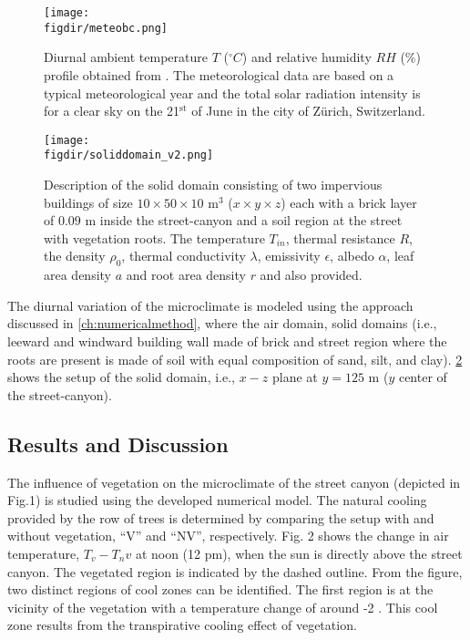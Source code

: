 \begin{figure}[p]
	\centering
	\texttt{[image: \\figdir/meteobc.png]}
	\caption{Diurnal ambient temperature $T$ ($^{\circ}C$) and relative humidity $RH$ (\%) profile obtained from \cite{Kubilay2018}. The meteorological data are based on a typical meteorological year and the total solar radiation intensity is for a clear sky on the 21$^{\mathrm{st}}$ of June in the city of Z\"urich, Switzerland. }
	\label{fig:meteobc}
\end{figure}

\begin{figure}[p]
	\centering
	\texttt{[image: \\figdir/soliddomain\_v2.png]}
	\caption{Description of the solid domain consisting of two impervious buildings of size $10 \times 50 \times 10$ m$^3$ ($x\times y \times z$) each with a brick layer of $0.09$ m inside the street-canyon and a soil region at the street with vegetation roots. The temperature $T_{\textit{in}}$, thermal resistance $R$, the density $\rho_0$, thermal conductivity $\lambda$, emissivity $\epsilon$, albedo $\alpha$, leaf area density $a$ and root area density $r$ and also provided. }
	\label{fig:soliddomain}
\end{figure}


The diurnal variation of the microclimate is modeled using the approach discussed in \cref{ch:numericalmethod}, where the air domain, solid domains (i.e., leeward and windward building wall made of brick and street region where the roots are present is made of soil with equal composition of sand, silt, and clay). \cref{fig:soliddomain} shows the setup of the solid domain, i.e., $x-z$ plane at $y=125$ m ($y$ center of the street-canyon). 


\subsection{Results and Discussion}

The influence of vegetation on the microclimate of the street canyon (depicted in Fig.1) is studied using the developed numerical model. The natural cooling provided by the row of trees is determined by comparing the setup with and without vegetation, “V” and “NV”, respectively. Fig. 2 shows the change in air temperature, $T_v-T_nv$ at noon (12 pm), when the sun is directly above the street canyon. The vegetated region is indicated by the dashed outline. From the figure, two distinct regions of cool zones can be identified. The first region is at the vicinity of the vegetation with a temperature change of around -2 . This cool zone results from the transpirative cooling effect of vegetation. 

